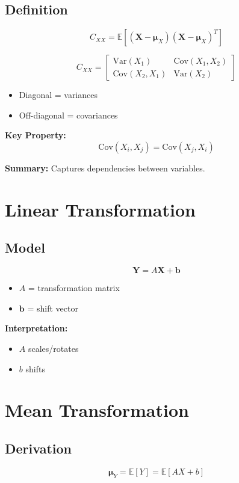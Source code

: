 \documentclass[12pt]{article}
\begin{document}
\subsection{Definition}
\[
C_{XX} = \mathbb{E}[(\mathbf{X} - \bm{\mu}_X)(\mathbf{X} - \bm{\mu}_X)^T]
\]

\[
C_{XX} =
\begin{bmatrix}
\text{Var}(X_1) & \text{Cov}(X_1,X_2) \\
\text{Cov}(X_2,X_1) & \text{Var}(X_2)
\end{bmatrix}
\]

\begin{itemize}
    \item Diagonal = variances
    \item Off-diagonal = covariances
\end{itemize}

\textbf{Key Property:}
\[
\text{Cov}(X_i, X_j) = \text{Cov}(X_j, X_i)
\]

\textbf{Summary:} Captures dependencies between variables.

\section{Linear Transformation}
\subsection{Model}
\[
\mathbf{Y} = A\mathbf{X} + \mathbf{b}
\]

\begin{itemize}
    \item $A$ = transformation matrix
    \item $\mathbf{b}$ = shift vector
\end{itemize}

\textbf{Interpretation:}
\begin{itemize}
    \item $A$ scales/rotates
    \item $b$ shifts
\end{itemize}

\section{Mean Transformation}
\subsection{Derivation}
\[
\bm{\mu}_Y = \mathbb{E}[Y] = \mathbb{E}[AX + b]
\]
\end{document}
